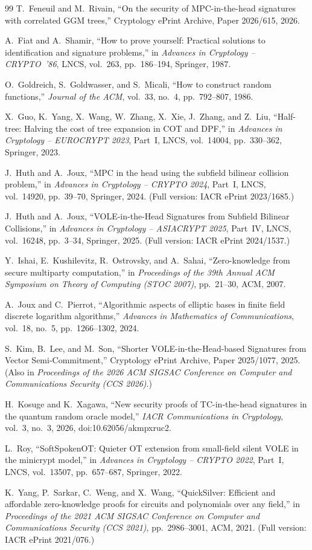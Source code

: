 \documentclass[11pt,a4paper]{article}
\theoremstyle{definition}
\theoremstyle{remark}
\begin{document}
\begin{thebibliography}{99}
T.~Feneuil and M.~Rivain,
``On the security of MPC-in-the-head signatures with correlated GGM trees,'' Cryptology ePrint Archive, Paper 2026/615, 2026.

A.~Fiat and A.~Shamir,
``How to prove yourself: Practical solutions to identification and signature problems,'' in \emph{Advances in Cryptology -- CRYPTO~'86}, LNCS, vol.~263, pp.~186--194, Springer, 1987.

O.~Goldreich, S.~Goldwasser, and S.~Micali,
``How to construct random functions,'' \emph{Journal of the ACM}, vol.~33, no.~4, pp.~792--807, 1986.

X.~Guo, K.~Yang, X.~Wang, W.~Zhang, X.~Xie, J.~Zhang, and Z.~Liu,
``Half-tree: Halving the cost of tree expansion in COT and DPF,'' in \emph{Advances in Cryptology -- EUROCRYPT 2023}, Part~I, LNCS, vol.~14004, pp.~330--362, Springer, 2023.

J.~Huth and A.~Joux,
``MPC in the head using the subfield bilinear collision problem,'' in \emph{Advances in Cryptology -- CRYPTO 2024}, Part~I, LNCS, vol.~14920, pp.~39--70, Springer, 2024. (Full version: IACR ePrint 2023/1685.)

J.~Huth and A.~Joux,
``VOLE-in-the-Head Signatures from Subfield Bilinear Collisions,'' in \emph{Advances in Cryptology -- ASIACRYPT 2025}, Part~IV, LNCS, vol.~16248, pp.~3--34, Springer, 2025. (Full version: IACR ePrint 2024/1537.)

Y.~Ishai, E.~Kushilevitz, R.~Ostrovsky, and A.~Sahai,
``Zero-knowledge from secure multiparty computation,'' in \emph{Proceedings of the 39th Annual ACM Symposium on Theory of Computing (STOC 2007)}, pp.~21--30, ACM, 2007.

A.~Joux and C.~Pierrot,
``Algorithmic aspects of elliptic bases in finite field discrete logarithm algorithms,'' \emph{Advances in Mathematics of Communications}, vol.~18, no.~5, pp.~1266--1302, 2024.

S.~Kim, B.~Lee, and M.~Son,
``Shorter VOLE-in-the-Head-based Signatures from Vector Semi-Commitment,'' Cryptology ePrint Archive, Paper 2025/1077, 2025. (Also in \emph{Proceedings of the 2026 ACM SIGSAC Conference on Computer and Communications Security (CCS 2026)}.)

H.~Kosuge and K.~Xagawa,
``New security proofs of TC-in-the-head signatures in the quantum random oracle model,'' \emph{IACR Communications in Cryptology}, vol.~3, no.~3, 2026, doi:10.62056/akmpxruc2.

L.~Roy,
``SoftSpokenOT: Quieter OT extension from small-field silent VOLE in the minicrypt model,'' in \emph{Advances in Cryptology -- CRYPTO 2022}, Part~I, LNCS, vol.~13507, pp.~657--687, Springer, 2022.

K.~Yang, P.~Sarkar, C.~Weng, and X.~Wang,
``QuickSilver: Efficient and affordable zero-knowledge proofs for circuits and polynomials over any field,'' in \emph{Proceedings of the 2021 ACM SIGSAC Conference on Computer and Communications Security (CCS 2021)}, pp.~2986--3001, ACM, 2021. (Full version: IACR ePrint 2021/076.)

\end{thebibliography}
\end{document}
